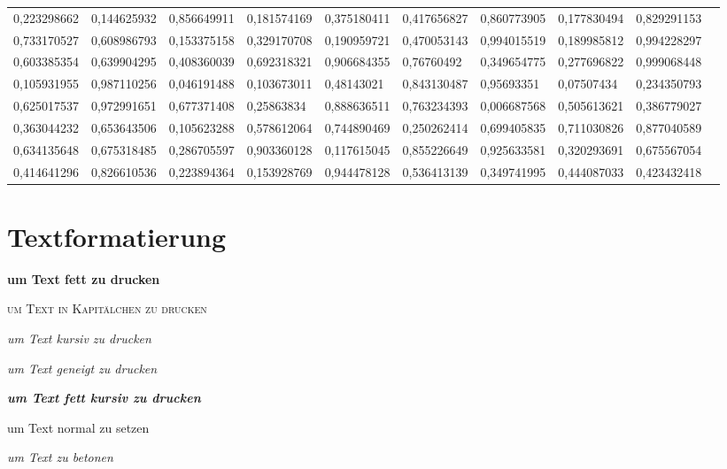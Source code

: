 \documentclass[12pt,ngerman,parskip=half]{scrartcl}
\begin{document}
\begin{landscape}
\begin{table}
\begin{center}
\begin{tabular}{llllllllll}
0,223298662	&	0,144625932	&	0,856649911	&	0,181574169	&	0,375180411	&	0,417656827	&	0,860773905	&	0,177830494	&	0,829291153	\\
0,733170527	&	0,608986793	&	0,153375158	&	0,329170708	&	0,190959721	&	0,470053143	&	0,994015519	&	0,189985812	&	0,994228297	\\
0,603385354	&	0,639904295	&	0,408360039	&	0,692318321	&	0,906684355	&	0,76760492	&	0,349654775	&	0,277696822	&	0,999068448	\\
0,105931955	&	0,987110256	&	0,046191488	&	0,103673011	&	0,48143021	&	0,843130487	&	0,95693351	&	0,07507434	&	0,234350793	\\
0,625017537	&	0,972991651	&	0,677371408	&	0,25863834	&	0,888636511	&	0,763234393	&	0,006687568	&	0,505613621	&	0,386779027	\\
0,363044232	&	0,653643506	&	0,105623288	&	0,578612064	&	0,744890469	&	0,250262414	&	0,699405835	&	0,711030826	&	0,877040589	\\
0,634135648	&	0,675318485	&	0,286705597	&	0,903360128	&	0,117615045	&	0,855226649	&	0,925633581	&	0,320293691	&	0,675567054	\\
0,414641296	&	0,826610536	&	0,223894364	&	0,153928769	&	0,944478128	&	0,536413139	&	0,349741995	&	0,444087033	&	0,423432418	\\ \bottomrule 
\end{tabular} 
\end{center}
\end{table}
\end{landscape}

\section{Textformatierung}

\textbf{um Text fett zu drucken}

\textsc{um Text in Kapitälchen zu drucken}

\textit{um Text kursiv zu drucken}

\textsl{um Text geneigt zu drucken}

\textit{\textbf{um Text fett kursiv zu drucken}}

\textup{um Text normal zu setzen}

\emph{um Text zu betonen}

\begin{comment} %
\blindtext
\end{comment}
\end{document}

